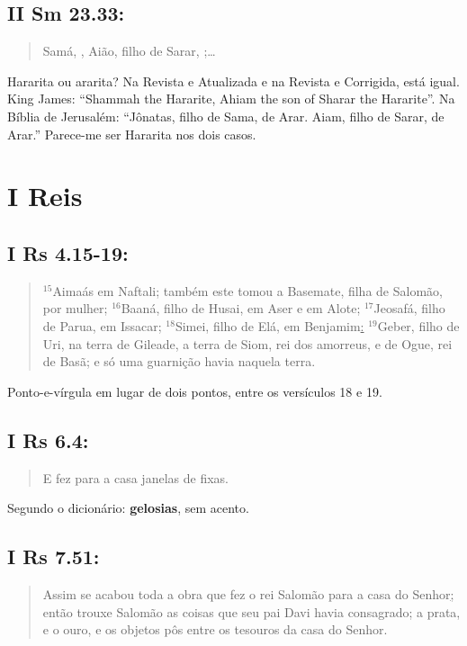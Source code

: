 \subsection{II Sm 23.33:}
\begin{quote}
    \small
Samá, , Aião, filho de Sarar, ;\ldots
\end{quote}

Hararita ou ararita? Na Revista e Atualizada e na Revista e Corrigida,
está igual. King James: ``Shammah the Hararite, Ahiam the son of
Sharar the Hararite''. Na Bíblia de Jerusalém: ``Jônatas, filho de
Sama, de Arar. Aiam, filho de Sarar, de Arar.'' Parece-me ser Hararita
nos dois casos.

\section{I Reis}
\subsection{I Rs 4.15-19:}
\begin{quote}
    \small
$^{\mathrm{15}}$Aimaás em Naftali; também este tomou a Basemate, filha de Salomão, por mulher; $^{\mathrm{16}}$Baaná, filho de Husai, em Aser e em Alote; $^{\mathrm{17}}$Jeosafá, filho de Parua, em Issacar; $^{\mathrm{18}}$Simei, filho de Elá, em Benjamim\uline{:} $^{\mathrm{19}}$Geber, filho de Uri, na terra de Gileade, a terra de Siom, rei dos amorreus, e de Ogue, rei de Basã; e só uma guarnição havia naquela terra.
\end{quote}

Ponto-e-vírgula em lugar de dois pontos, entre os versículos 18 e 19.

\subsection{I Rs 6.4:}
\begin{quote}
    \small
E fez para a casa janelas de  fixas.
\end{quote}

Segundo o dicionário: \textbf{gelosias}, sem acento.

\subsection{I Rs 7.51:}
\begin{quote}
    \small
Assim se acabou toda a obra que fez o rei Salomão para a casa do Senhor\uline{;} então trouxe Salomão as coisas que seu pai Davi havia consagrado; a prata, e o ouro, e os objetos pôs entre os tesouros da casa do Senhor.
\end{quote}

